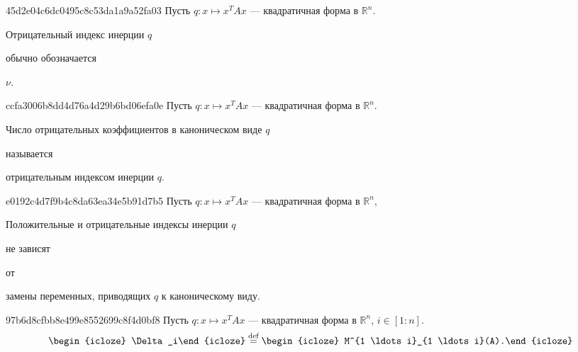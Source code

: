 \begin{note}{45d2e04c6dc0495c8c53da1a9a52fa03}
    Пусть \({ q : x \mapsto x^{T}Ax }\) --- квадратичная форма в \({ \mathbb R^{n} }\).
    \begin{icloze}{2}Отрицательный индекс инерции \({ q }\)\end{icloze} обычно обозначается \begin{icloze}{1}\({ \nu }\).\end{icloze}
\end{note}

\begin{note}{ccfa3006b8dd4d76a4d29b6bd06efa0e}
    Пусть \({ q : x \mapsto x^{T}Ax }\) --- квадратичная форма в \({ \mathbb R^{n} }\).
    \begin{icloze}{1}Число отрицательных коэффициентов в каноническом виде \({ q }\)\end{icloze} называется \begin{icloze}{2}отрицательным индексом инерции \({ q }\).\end{icloze}
\end{note}

\begin{note}{e0192c4d7f9b4c8da63ea34e5b91d7b5}
    Пусть \({ q : x \mapsto x^{T}Ax }\) --- квадратичная форма в \({ \mathbb R^{n} }\),\:
    \begin{icloze}{3}Положительные и отрицательные индексы инерции \({ q }\)\end{icloze} \begin{icloze}{2}не зависят\end{icloze} от \begin{icloze}{1}замены переменных, приводящих \({ q }\) к каноническому виду.\end{icloze}
\end{note}

\begin{note}{97b6d8cfbb8e499e8552699c8f4d0bf8}
    Пусть \({ q : x \mapsto x^{T}Ax }\) --- квадратичная форма в \({ \mathbb R^{n} }\),\: \({ i \in [1 : n] }\).
    \[
        \begin{icloze}{2}\Delta_i\end{icloze} \overset{\text{def}}= \begin{icloze}{1}M^{1 \ldots i}_{1 \ldots i}(A).\end{icloze}
    \]
\end{note}

